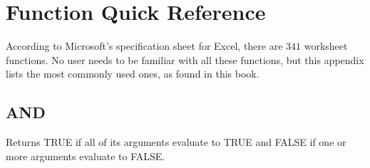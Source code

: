 



\chapter{Function Quick Reference}\label{app01:functions}

According to Microsoft's specification sheet for Excel, there are $ 341 $ worksheet functions. No user needs to be familiar with all these functions, but this appendix lists the most commonly used ones, as found in this book.

\section{AND}

Returns TRUE if all of its arguments evaluate to TRUE and FALSE if one or more arguments evaluate to FALSE.


